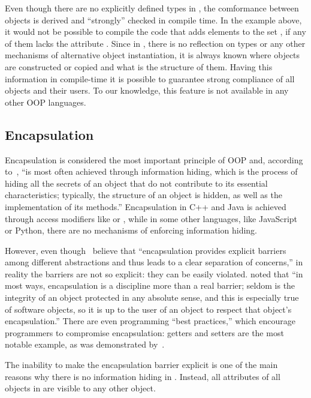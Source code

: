 Even though there are no explicitly defined types in \phic{},
the comformance between objects is derived and ``strongly'' checked
in compile time. In the example above, it would not be possible to
compile the code that adds elements to the set , if any
of them lacks the attribute . Since in \eo{},
there is no reflection on types or any other mechanisms
of alternative object instantiation, it is always known where
objects are constructed or copied and what is the structure of them.
Having this information in compile-time it is possible to guarantee
strong compliance of all objects and their users. To our knowledge,
this feature is not available in any other OOP languages.

\subsection{Encapsulation}

Encapsulation is considered the most important principle of OOP
and, according to~\citet[p.51]{grady2007object},
``is most often achieved through information hiding,
which is the process of hiding all the secrets of an object
that do not contribute to its essential characteristics;
typically, the structure of an object is hidden, as well
as the implementation of its methods.'' Encapsulation in C++ and
Java is achieved through access modifiers like  or
, while in some other languages, like JavaScript or Python,
there are no mechanisms of enforcing information hiding.

However, even though~\citet[p.51]{grady2007object} believe that
``encapsulation provides explicit barriers among different
abstractions and thus leads to a clear separation of concerns,''
in reality the barriers are not so explicit: they can be easily
violated.
\citet[p.141]{west2004object} noted that
``in most ways, encapsulation is a discipline more than a real barrier;
seldom is the integrity of an object protected in any absolute
sense, and this is especially true of software objects,
so it is up to the user of an object to respect that object's encapsulation.''
There are even programming ``best practices,'' which encourage
programmers to compromise encapsulation: getters and setters are
the most notable example, as was demonstrated by~\citet{holub2004more}.

The inability to make the encapsulation barrier explicit
is one of the main reasons why there is no information hiding in \phic{}.
Instead, all attributes of all objects in \phic{}
are visible to any other object.

